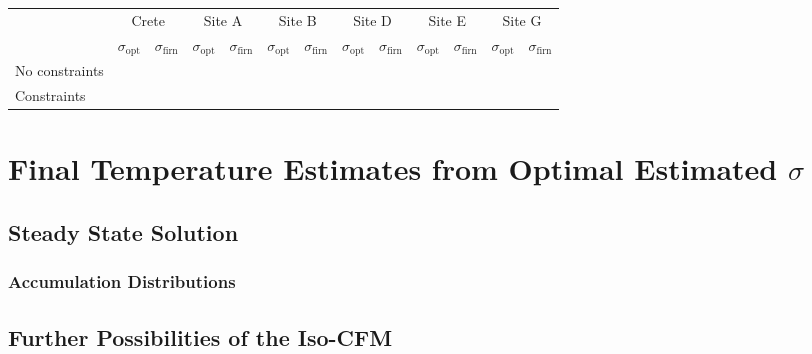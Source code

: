 \documentclass[../../CompleteThesis2/Complete_2ndDraft]{subfiles}
\begin{document}
\begin{table}[ht]
	\centering
	\begin{tabular}{l||*{6}{c | c||}}
		&
		\multicolumn{2}{c}{Crete} & \multicolumn{2}{c}{Site A} & \multicolumn{2}{c}{Site B} & \multicolumn{2}{c}{Site D} & \multicolumn{2}{c}{Site E} & \multicolumn{2}{c||}{Site G} \\
		&
		$\sigma_{\text{opt}}$ & $\sigma_{\text{firn}}$ & $\sigma_{\text{opt}}$ & $\sigma_{\text{firn}}$ & $\sigma_{\text{opt}}$ & $\sigma_{\text{firn}}$ & $\sigma_{\text{opt}}$ & $\sigma_{\text{firn}}$ & $\sigma_{\text{opt}}$ & $\sigma_{\text{firn}}$ & $\sigma_{\text{opt}}$ & $\sigma_{\text{firn}}$ \\
		
		\hline
		No constraints & & & & & & & & & & & & \\ 
		Constraints & & & & & & & & & & & & \\ 
	\end{tabular}
\end{table}

\section[Temperature Estimates from Data]{Final Temperature Estimates from Optimal Estimated $\sigma$}
\label{Sec:Results_TempEstData}

\subsection[Steady State Solution]{Steady State Solution}
\label{Sec:Results_TempEstData_StSt}

\subsubsection[Accumulation Distributions]{Accumulation Distributions}
\label{Sec:Results_TempEstData_StSt_AccumDists}

\subsection[Iso-CFM Possibilities]{Further Possibilities of the Iso-CFM}
\label{Sec:Results_TempEstData_IsoCFMPossibilities}
\end{document}
